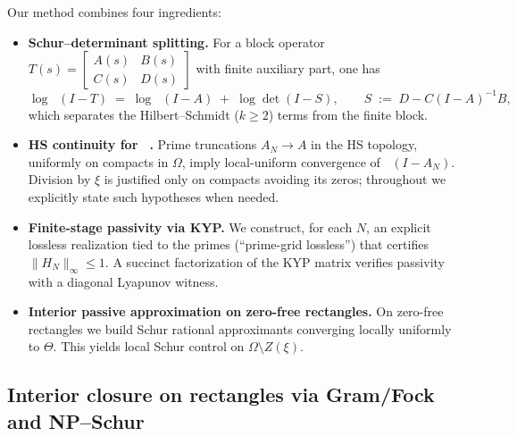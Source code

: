 \documentclass[11pt]{article}
\theoremstyle{definition}
\theoremstyle{remark}
\DeclareMathOperator{\dettwo}{det_2}
\begin{document}
Our method combines four ingredients:
\begin{itemize}
 \item \textbf{Schur--determinant splitting.} For a block operator \(T(s)=\begin{bmatrix}A(s)&B(s)\\ C(s)&D(s)\end{bmatrix}\) with finite auxiliary part, one has
 \[
  \log\dettwo(I-T)\;=\;\log\dettwo(I-A)\; +\; \log\det(I-S),\qquad S\;:=\;D-C(I-A)^{-1}B,
 \]
 which separates the Hilbert--Schmidt (\(k\ge 2\)) terms from the finite block.
 \item \textbf{HS continuity for \(\dettwo\).} Prime truncations \(A_N\to A\) in the HS topology, uniformly on compacts in \(\Omega\), imply local-uniform convergence of \(\dettwo(I-A_N)\). Division by \(\xi\) is justified only on compacts avoiding its zeros; throughout we explicitly state such hypotheses when needed.
 \item \textbf{Finite-stage passivity via KYP.} We construct, for each \(N\), an explicit lossless realization tied to the primes (``prime-grid lossless'') that certifies \(\|H_N\|_\infty\le 1\). A succinct factorization of the KYP matrix verifies passivity with a diagonal Lyapunov witness.
 \item \textbf{Interior passive approximation on zero-free rectangles.} On zero-free rectangles we build Schur rational approximants converging locally uniformly to \(\Theta\). This yields local Schur control on \(\Omega\setminus Z(\xi)\).
\end{itemize}


\subsection*{Interior closure on rectangles via Gram/Fock and NP--Schur}
\end{document}
